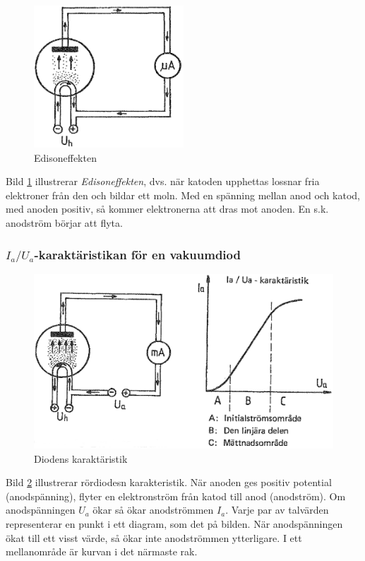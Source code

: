 \begin{figure}
\includegraphics[width=0.5\textwidth]{images/cropped_pdfs/bild_2_2-25.pdf}
\caption{Edisoneffekten}
\label{fig:BildII2-25}
\end{figure}

Bild \ref{fig:BildII2-25} illustrerar \emph{Edisoneffekten}, dvs. när katoden
upphettas lossnar fria elektroner från den och bildar ett moln.
Med en spänning mellan anod och katod, med anoden positiv, så kommer
elektronerna att dras mot anoden.
En s.k. anodström börjar att flyta.

\subsubsection{\(I_a/U_a\)-karaktäristikan för en vakuumdiod}

\begin{figure}
\includegraphics[width=\textwidth]{images/cropped_pdfs/bild_2_2-26.pdf}
\caption{Diodens karaktäristik}
\label{fig:BildII2-26}
\end{figure}

Bild \ref{fig:BildII2-26} illustrerar rördiodesn karakteristik.
När anoden ges positiv potential (anodspänning), flyter en elektronström från
katod till anod (anodström).
Om anodspänningen \(U_a\) ökar så ökar anodströmmen \(I_a\).
Varje par av talvärden representerar en punkt i ett diagram, som det på bilden.
När anodspänningen ökat till ett visst värde, så ökar inte anodströmmen
ytterligare.
I ett mellanområde är kurvan i det närmaste rak.

